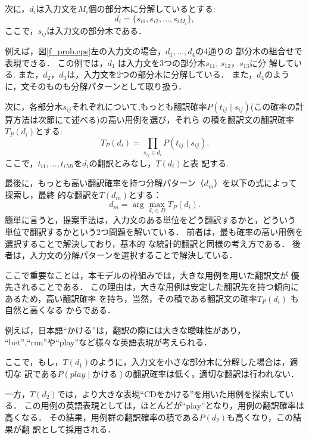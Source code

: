 次に，$d_{i}$は入力文を$M_{i}$個の部分木に分解しているとする:
\begin{equation}
d_{i}=\{s_{i1},s_{i2},...,s_{iM_{i}} \},
\end{equation}
ここで，$s_{ij}$は入力文の部分木である．

例えば，図\ref{f_prob.eps}左の入力文の場合，$d_{1},...,d_{4}$の4通りの
部分木の組合せで表現できる．
この例では，$d_{1}$ は入力文を3つの部分木$s_{11}$, $s_{12}$，$s_{13}$に分
解している.
また，$d_{2}$，$d_{3}$は，入力文を2つの部分木に分解している．
また，$d_{4}$のように，文そのものも分解パターンとして取り扱う．

次に，各部分木$s_{ij}$それぞれについて,もっとも翻訳確率$P( t_{ij} \mid
s_{ij} )$(この確率の計算方法は次節にて述べる)の高い用例を選び，それら
の積を翻訳文の翻訳確率$T_{P}(d_{i})$とする:
\begin{equation}
T_{P}(d_{i})=\prod_{s_{ij} \in d_{i}}  P( t_{ij} \mid s_{ij} ).
\end{equation}
ここで，$t_{i1},...,t_{iM{i}}$を$d_{i}$の翻訳とみなし，$T(d_{i})$と表
記する.

最後に，もっとも高い翻訳確率を持つ分解パターン（$d_m$）を以下の式によって探索し，最終
的な翻訳を$T(d_m)$とする：
\begin{equation}
d_m = \arg\max_{d_{i} \in D} T_{P}(d_{i}).
\end{equation}
簡単に言うと，提案手法は，入力文のある単位をどう翻訳するかと，どういう
単位で翻訳するかという2つ問題を解いている．
前者は，最も確率の高い用例を選択することで解決しており，基本的
な統計的翻訳と同様の考え方である．
後者は，入力文の分解パターンを選択することで解決している．


ここで重要なことは，本モデルの枠組みでは，大きな用例を用いた翻訳文が
優先されることである．
この理由は，大きな用例は安定した翻訳先を持つ傾向にあるため，高い翻訳確率
を持ち，当然，その積である翻訳文の確率$ T_{P}(d_{i})$ も自然と高くなる
からである．

例えば，日本語``かける''は，翻訳の際には大きな曖昧性があり，
``bet'',``run''や``play''など様々な英語表現が考えられる．

ここで，もし，$T(d_{1})$のように，入力文を小さな部分木に分解した場合は，適切な
訳である$P(play \mid かける )$の翻訳確率は低く，適切な翻訳は行われない．

一方，$T(d_{2})$では，より大きな表現``CDをかける''を用いた用例を探索している．
この用例の英語表現としては，ほとんどが``play''となり，用例の翻訳確率は
高くなる．
その結果，用例群の翻訳確率の積である$P(d_{2})$も高くなり，この結果が翻
訳として採用される．

